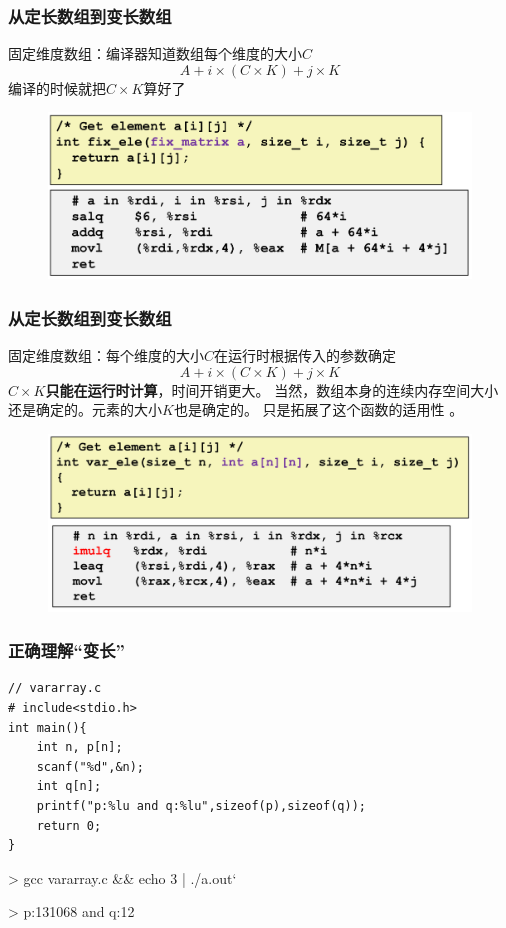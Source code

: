 \documentclass[12pt,AutoFakeBold,aspectratio=169,mathserif]{beamer}
\begin{document}
    \begin{frame}
        \frametitle{从定长数组到变长数组}
    
        固定维度数组：编译器知道数组每个维度的大小\(C\)
        \[A+i\times (C\times K)+j\times K\]
        编译的时候就把\(C\times K\)算好了
        \begin{figure}
            \includegraphics[width=.8\textwidth]{figures/fixed.png}
        \end{figure}
    
    \end{frame}

    \begin{frame}
        \frametitle{从定长数组到变长数组}
    
        固定维度数组：每个维度的大小\(C\)在运行时根据传入的参数确定
        \[A+i\times (C\times K)+j\times K\]
        \textbf{\(C\times K\)只能在运行时计算}，时间开销更大。
% 
        当然，数组本身的连续内存空间大小还是确定的。元素的大小\(K\)也是确定的。
% 
        只是拓展了这个函数的适用性
        。
        \begin{figure}
            \includegraphics[width=.8\textwidth]{figures/var.png}
        \end{figure}
    
    \end{frame}

    \begin{frame}[fragile]
        \frametitle{正确理解“变长”}
    
        \begin{lstlisting}
// vararray.c
# include<stdio.h>
int main(){
    int n, p[n];
    scanf("%d",&n);
    int q[n];
    printf("p:%lu and q:%lu",sizeof(p),sizeof(q));
    return 0;
}
        \end{lstlisting}

        > gcc vararray.c \&\& echo 3 | ./a.out`

        > p:131068 and q:12
    
    \end{frame}
\end{document}
